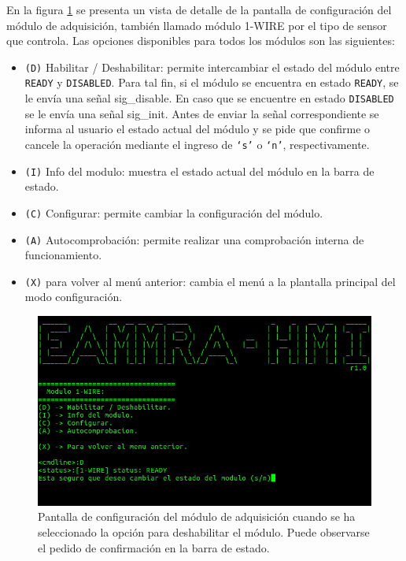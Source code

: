 En la figura \ref{fig:interfaz_config_detalle} se presenta un vista de detalle de la pantalla de configuración del módulo de adquisición, también llamado módulo 1-WIRE por el tipo de sensor que controla.  Las opciones disponibles para todos los módulos son las siguientes:

\begin{itemize}
  \item \texttt{(D)} Habilitar / Deshabilitar: permite intercambiar el estado del módulo entre \texttt{READY} y \texttt{DISABLED}.  Para tal fin, si el módulo se encuentra en estado \texttt{READY}, se le envía una señal sig\_disable.  En caso que se encuentre en estado \texttt{DISABLED} se le envía una señal sig\_init.  Antes de enviar la señal correspondiente se informa al usuario el estado actual del módulo y se pide que confirme o cancele la operación mediante el ingreso de \texttt{`s'} o \texttt{`n'}, respectivamente.
  \item \texttt{(I)} Info del modulo: muestra el estado actual del módulo en la barra de estado.
  \item \texttt{(C)} Configurar: permite cambiar la configuración del módulo.
  \item \texttt{(A)} Autocomprobación: permite realizar una comprobación interna de funcionamiento.
  \item \texttt{(X)} para volver al menú anterior: cambia el menú a la plantalla principal del modo configuración.
\end{itemize}

\begin{figure}[htpb]
	\centering
	\includegraphics[width=\textwidth]{./Figures/interfaz_config_detalle.png}
	\caption[Pantalla de configuración del módulo de adquisición.]{Pantalla de configuración del módulo de adquisición cuando se ha seleccionado la opción para deshabilitar el módulo.  Puede observarse el pedido de confirmación en la barra de estado.} 
	\label{fig:interfaz_config_detalle}
\end{figure}


